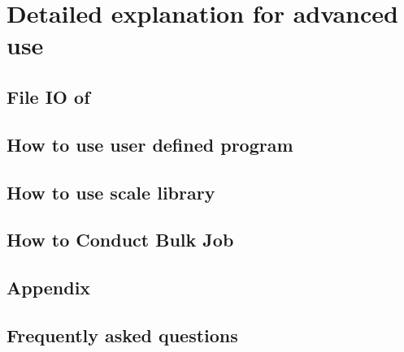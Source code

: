 \documentclass[a4paper]{report}
\begin{document}
\part{Detailed explanation for advanced use} \label{part:advance_use}
 \chapter{File IO of \scalelib}
 

 \chapter{How to use user defined program}
 
 \chapter{How to use scale library}
 
 

 \chapter{How to Conduct Bulk Job}
 




\begin{appendix}
\part{Appendix}
\chapter{Frequently asked questions} \label{achap:practice}


\end{appendix}


\ClearWallPaper

\end{document}
